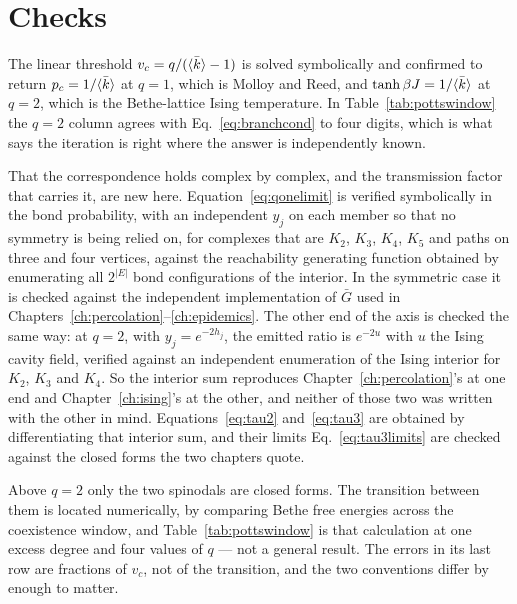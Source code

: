 \section{Checks}
\label{sec:potts-checks}

The linear threshold $v_{c}=q/(\langle \bar k \rangle-1)$ is solved symbolically and
confirmed to return $p_{c}=1/\langle \bar k \rangle$ at $q=1$, which is Molloy and Reed,
and $\tanh\beta J=1/\langle \bar k \rangle$ at $q=2$, which is the Bethe-lattice Ising
temperature. In Table~\ref{tab:pottswindow} the $q=2$ column agrees with
Eq.~\eqref{eq:branchcond} to four digits, which is what says the iteration is
right where the answer is independently known.

That the correspondence holds complex by complex, and the transmission factor
that carries it, are new here. Equation~\eqref{eq:qonelimit} is verified
symbolically in the bond probability, with an independent $y_{j}$ on each member
so that no symmetry is being relied on, for complexes that are $K_{2}$, $K_{3}$,
$K_{4}$, $K_{5}$ and paths on three and four vertices, against the reachability
generating function obtained by enumerating all $2^{|E|}$ bond configurations of
the interior. In the symmetric case it is checked against the independent
implementation of $\bar G$ used in
Chapters~\ref{ch:percolation}--\ref{ch:epidemics}. The other end of the axis is
checked the same way: at $q=2$, with $y_{j}=e^{-2h_{j}}$, the emitted ratio is
$e^{-2u}$ with $u$ the Ising cavity field, verified against an independent
enumeration of the Ising interior for $K_{2}$, $K_{3}$ and $K_{4}$. So the
interior sum reproduces Chapter~\ref{ch:percolation}'s at one end and
Chapter~\ref{ch:ising}'s at the other, and neither of those two was written with
the other in mind. Equations~\eqref{eq:tau2} and~\eqref{eq:tau3} are obtained by
differentiating that interior sum, and their limits
Eq.~\eqref{eq:tau3limits} are checked against the closed forms the two chapters
quote.

Above $q=2$ only the two spinodals are closed forms. The transition between them
is located numerically, by comparing Bethe free energies across the coexistence
window, and Table~\ref{tab:pottswindow} is that calculation at one excess degree
and four values of $q$ --- not a general result. The errors in its last row are
fractions of $v_{c}$, not of the transition, and the two conventions differ by
enough to matter.
